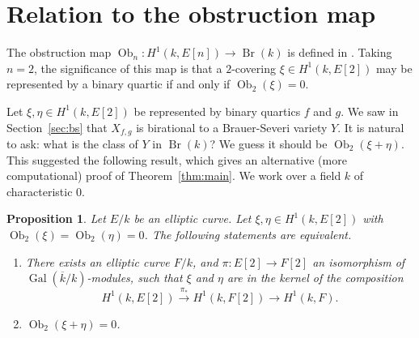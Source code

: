 \documentclass[12pt]{amsart}
\newcommand{\Gal}{{\operatorname{Gal}}}
\newcommand{\Br}{\operatorname{Br}}
\newcommand{\Ob}{\operatorname{Ob}}
\newcommand{\ra}{\longrightarrow}
\newcommand{\kbar}{{\overline k}}
\newtheorem{Proposition}{Proposition}[section]
\theoremstyle{definition}
\begin{document}
\section{Relation to the obstruction map}
\label{sec:ob}

The obstruction map $\Ob_n : H^1(k,E[n]) \to \Br(k)$ is defined in
\cite{CFOSS, ONeil}.  Taking $n=2$, the significance of this map is
that a $2$-covering $\xi \in H^1(k,E[2])$ may be represented by a
binary quartic if and only if $\Ob_2(\xi) = 0$.

Let $\xi,\eta \in H^1(k,E[2])$ be represented by binary quartics $f$
and $g$.  We saw in Section~\ref{sec:bs} that $X_{f,g}$ is birational
to a Brauer-Severi variety $Y$. It is natural to ask: what is the
class of $Y$ in $\Br(k)$? We guess it should be $\Ob_2(\xi + \eta)$.
This suggested the following result, which gives an alternative (more
computational) proof of Theorem~\ref{thm:main}.  We work over a field
$k$ of characteristic $0$.

\begin{Proposition}
\label{prop:ob}
Let $E/k$ be an elliptic curve.  Let $\xi,\eta \in H^1(k,E[2])$ with
$\Ob_2(\xi) = \Ob_2(\eta) = 0$.  The following statements are
equivalent.
\begin{enumerate}
\item There exists an elliptic curve $F/k$, and $\pi: E[2] \to F[2]$
  an isomorphism of $\Gal(\kbar/k)$-modules, such that $\xi$ and
  $\eta$ are in the kernel of the composition
\[ H^1(k,E[2]) \stackrel{\pi_*}{\ra} H^1(k,F[2]) \ra H^1(k,F). \]
\item  $\Ob_2(\xi + \eta) = 0$.
\end{enumerate}
\end{Proposition}
\end{document}
